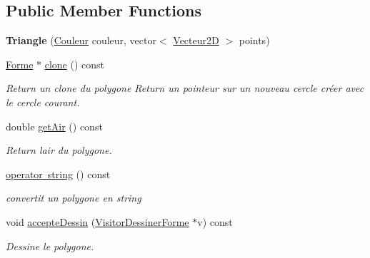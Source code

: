 \subsection*{Public Member Functions}
\begin{DoxyCompactItemize}
\item 
\mbox{\label{class_triangle_a05eebba4f10fecb894246f50f1770636}} 
{\bfseries Triangle} (\mbox{\hyperlink{class_couleur}{Couleur}} couleur, vector$<$ \mbox{\hyperlink{class_vecteur2_d}{Vecteur2D}} $>$ points)
\item 
\mbox{\label{class_triangle_a9ed5d2e740b1130192a8aa30d5541cb7}} 
\mbox{\hyperlink{class_forme}{Forme}} $\ast$ \mbox{\hyperlink{class_triangle_a9ed5d2e740b1130192a8aa30d5541cb7}{clone}} () const
\begin{DoxyCompactList}\small\item\em Return un clone du polygone Return un pointeur sur un nouveau cercle créer avec le cercle courant. \end{DoxyCompactList}\item 
\mbox{\label{class_triangle_a362e1877b1cf7d718ecbce666bd8e5f7}} 
double \mbox{\hyperlink{class_triangle_a362e1877b1cf7d718ecbce666bd8e5f7}{get\+Air}} () const
\begin{DoxyCompactList}\small\item\em Return l\textquotesingle{}air du polygone. \end{DoxyCompactList}\item 
\mbox{\label{class_triangle_acd8612cc20ffb71e543944c869e4ab81}} 
\mbox{\hyperlink{class_triangle_acd8612cc20ffb71e543944c869e4ab81}{operator string}} () const
\begin{DoxyCompactList}\small\item\em convertit un polygone en string \end{DoxyCompactList}\item 
void \mbox{\hyperlink{class_triangle_a62721a9e7bba3365fa3b72534511ee2b}{accepte\+Dessin}} (\mbox{\hyperlink{class_visitor_dessiner_forme}{Visitor\+Dessiner\+Forme}} $\ast$v) const
\begin{DoxyCompactList}\small\item\em Dessine le polygone. \end{DoxyCompactList}\end{DoxyCompactItemize}


